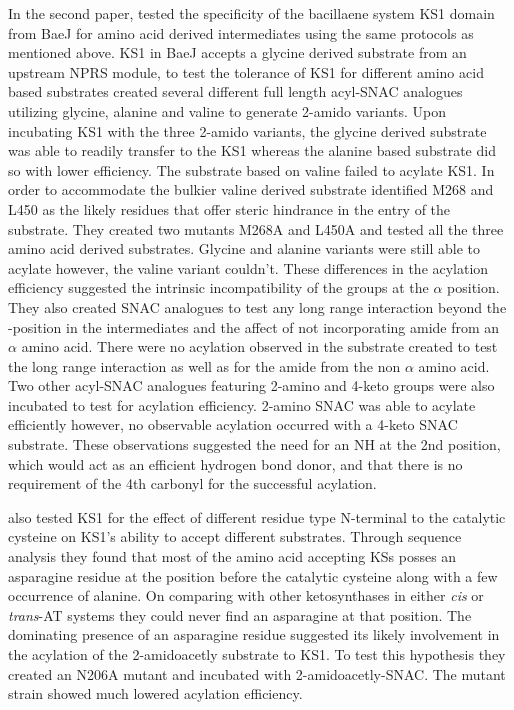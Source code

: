 			In the second paper, \textcite{Kohlhaas2013} tested the specificity of the bacillaene system KS1 domain from BaeJ for amino acid derived intermediates using the same protocols as mentioned above. KS1 in BaeJ accepts a glycine derived substrate from an upstream NPRS module, to test the tolerance of KS1 for different amino acid based substrates \textcite{Kohlhaas2013} created several different full length acyl-SNAC analogues utilizing glycine, alanine and valine to generate 2-amido variants. Upon incubating KS1 with the three 2-amido variants, the glycine derived substrate was able to readily transfer to the KS1 whereas the alanine based substrate did so with lower efficiency. The substrate based on valine failed to acylate KS1. In order to accommodate the bulkier valine derived substrate \textcite{Kohlhaas2013} identified M268 and L450 as the likely residues that offer steric hindrance in the entry of the substrate. They created two mutants M268A and L450A and tested all the three amino acid derived substrates. Glycine and alanine variants were still able to acylate however, the valine variant couldn't. These differences in the acylation efficiency suggested the intrinsic incompatibility of the groups at the $ \alpha $ position. They also created SNAC analogues to test any long range interaction beyond the \bet-position in the intermediates and the affect of not incorporating amide from an $ \alpha $ amino acid. There were no acylation observed in the substrate created to test the long range interaction as well as for the amide from the non $ \alpha $ amino acid. Two other acyl-SNAC analogues featuring 2-amino and 4-keto groups were also incubated to test for acylation efficiency. 2-amino SNAC  was able to acylate efficiently however, no observable acylation occurred with a 4-keto SNAC substrate. These observations suggested the need for an NH at the 2nd position, which would act as an efficient hydrogen bond donor, and that there is no requirement of the 4th carbonyl for the successful acylation. 
			
			\textcite{Kohlhaas2013} also tested KS1 for the effect of different residue type N-terminal to the catalytic cysteine on KS1's ability to accept different substrates. Through sequence analysis they found that most of the amino acid accepting KSs posses an asparagine residue at the position before the catalytic cysteine along with a few occurrence of alanine. On comparing with other ketosynthases in either \textit{cis} or \textit{trans}-AT systems they could never find an asparagine at that position. The dominating presence of an asparagine residue suggested its likely involvement in the acylation of the 2-amidoacetly substrate to KS1. To test this hypothesis they created an N206A mutant and incubated with 2-amidoacetly-SNAC. The mutant strain showed much lowered acylation efficiency. 
			
